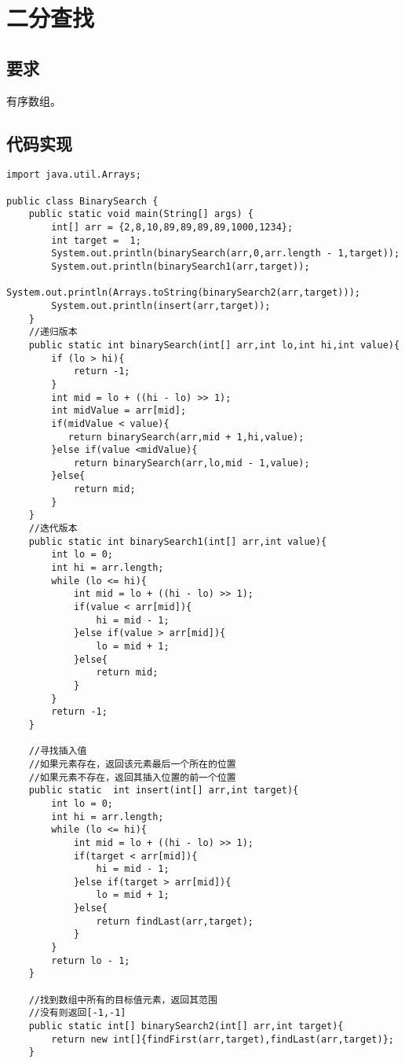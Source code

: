 \documentclass[a4paper]{report}
\begin{document}
\section{二分查找}
\subsection{要求}
有序数组。
\subsection{代码实现}
\begin{lstlisting}
import java.util.Arrays;

public class BinarySearch {
    public static void main(String[] args) {
        int[] arr = {2,8,10,89,89,89,89,1000,1234};
        int target =  1;
        System.out.println(binarySearch(arr,0,arr.length - 1,target));
        System.out.println(binarySearch1(arr,target));
        System.out.println(Arrays.toString(binarySearch2(arr,target)));
        System.out.println(insert(arr,target));
    }
    //递归版本
    public static int binarySearch(int[] arr,int lo,int hi,int value){
        if (lo > hi){
            return -1;
        }
        int mid = lo + ((hi - lo) >> 1);
        int midValue = arr[mid];
        if(midValue < value){
           return binarySearch(arr,mid + 1,hi,value);
        }else if(value <midValue){
            return binarySearch(arr,lo,mid - 1,value);
        }else{
            return mid;
        }
    }
    //迭代版本
    public static int binarySearch1(int[] arr,int value){
        int lo = 0;
        int hi = arr.length;
        while (lo <= hi){
            int mid = lo + ((hi - lo) >> 1);
            if(value < arr[mid]){
                hi = mid - 1;
            }else if(value > arr[mid]){
                lo = mid + 1;
            }else{
                return mid;
            }
        }
        return -1;
    }

    //寻找插入值
    //如果元素存在，返回该元素最后一个所在的位置
    //如果元素不存在，返回其插入位置的前一个位置
    public static  int insert(int[] arr,int target){
        int lo = 0;
        int hi = arr.length;
        while (lo <= hi){
            int mid = lo + ((hi - lo) >> 1);
            if(target < arr[mid]){
                hi = mid - 1;
            }else if(target > arr[mid]){
                lo = mid + 1;
            }else{
                return findLast(arr,target);
            }
        }
        return lo - 1;
    }

    //找到数组中所有的目标值元素，返回其范围
    //没有则返回[-1,-1]
    public static int[] binarySearch2(int[] arr,int target){
        return new int[]{findFirst(arr,target),findLast(arr,target)};
    }


\end{lstlisting}
\end{document}
